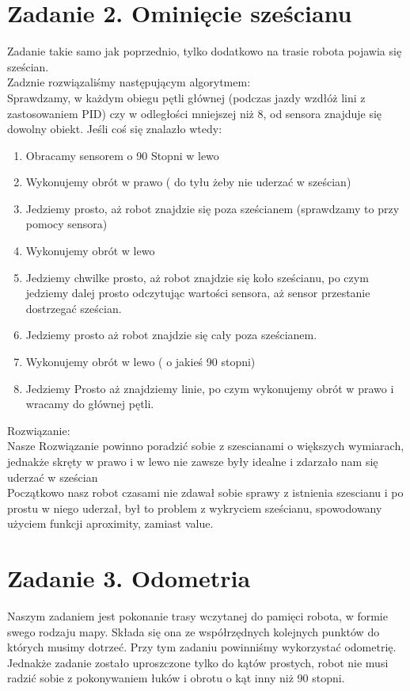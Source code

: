 \documentclass[paper=a4, fontsize=11pt]{scrartcl} %
\numberwithin{equation}{section} %
\numberwithin{figure}{section} %
\numberwithin{table}{section} %
\begin{document}
\section{Zadanie 2. Ominięcie sześcianu}
Zadanie takie samo jak poprzednio, tylko dodatkowo na trasie robota pojawia się sześcian.  
 \\
Zadznie rozwiązaliśmy następującym algorytmem:\\  
Sprawdzamy, w każdym obiegu pętli głównej (podczas jazdy wzdłóż lini z zastosowaniem PID) czy w odległości mniejszej niż 8, od sensora znajduje się dowolny obiekt. Jeśli coś się znalazło wtedy: 
\begin{enumerate}  
\item Obracamy sensorem o 90 Stopni w lewo  
\item Wykonujemy obrót w prawo ( do tyłu żeby nie uderzać w sześcian)  
\item Jedziemy prosto, aż robot znajdzie się poza sześcianem (sprawdzamy to przy pomocy sensora)  
\item Wykonujemy obrót w lewo  
\item Jedziemy chwilke prosto, aż robot znajdzie się koło sześcianu, po czym jedziemy dalej prosto odczytując wartości sensora, aż sensor przestanie dostrzegać sześcian.  
\item Jedziemy prosto aż robot znajdzie się cały poza sześcianem.  
\item Wykonujemy obrót w lewo ( o jakieś 90 stopni)  
\item Jedziemy  Prosto aż znajdziemy linie, po czym wykonujemy obrót w prawo i wracamy do głównej pętli. 
\end{enumerate}
Rozwiązanie:  
\\
 Nasze Rozwiązanie powinno poradzić sobie z szescianami o większych wymiarach, jednakże skręty w prawo i w lewo nie zawsze były idealne i zdarzało nam się uderzać w sześcian 
\\
Początkowo  nasz robot czasami nie zdawał sobie sprawy z istnienia szescianu i po prostu w niego uderzał,  był to problem z wykryciem sześcianu, spowodowany użyciem funkcji aproximity, zamiast value.  
\section{Zadanie 3. Odometria}
Naszym zadaniem jest pokonanie trasy wczytanej do pamięci robota, w formie swego rodzaju mapy. Składa się ona ze współrzędnych kolejnych punktów do których musimy dotrzeć. Przy tym zadaniu powinniśmy wykorzystać odometrię. Jednakże zadanie zostało uproszczone tylko do kątów prostych, robot nie musi radzić sobie z pokonywaniem łuków i obrotu o kąt inny niż 90 stopni. 
\end{document}
